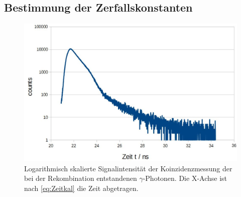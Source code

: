 \documentclass[numbers=noenddot,12pt,a4paper]{scrartcl}
\begin{document}
	\subsection{Bestimmung der Zerfallskonstanten}
		
		\begin{figure}[!h]
			\centering
			\label{abb:Messung1}
			\includegraphics[width=0.7\columnwidth]{pics/Messung1}
			\caption{Logarithmisch skalierte Signalintensität der Koinzidenzmessung der bei der Rekombination entstandenen $\gamma$-Photonen. Die X-Achse ist nach \eqref{eq:Zeitkal} die Zeit abgetragen.}
		\end{figure}
		
\end{document}
